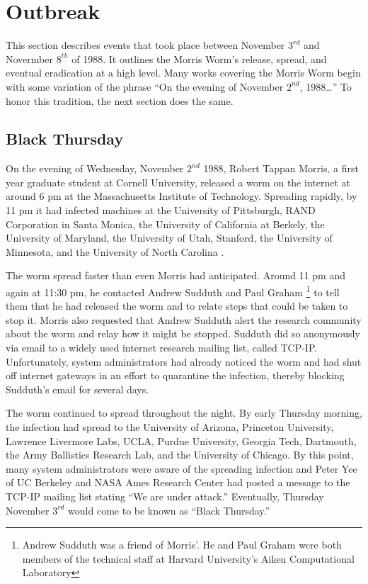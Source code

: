 \section*{Outbreak}
This section describes events that took place between November $3^{rd}$ and
Novermber $8^{th}$ of 1988. It outlines the Morris Worm's release, spread, and
eventual eradication at a high level.
Many works covering the Morris Worm begin with some variation of the phrase
``On the evening of November $2^{nd}$, 1988\ldots''
To honor this tradition, the next section does the same. 

\subsection*{Black Thursday}

On the evening of Wednesday, November $2^{nd}$ 1988, Robert Tappan Morris, a
first year graduate student at Cornell University, released a worm on the
internet at around 6 pm at the Massachusetts Institute of Technology.
Spreading rapidly, by 11 pm it had infected machines at
the University of Pittsburgh,
RAND Corporation in Santa Monica,
the University of California at Berkely,
the University of Maryland,
the University of Utah,
Stanford,
the University of Minnesota,
and the University of North Carolina
\cite{seeley_tour_1989}
\cite{spafford_internet_1989-1}.

The worm spread faster than even Morris had anticipated. Around
11 pm and again at 11:30 pm, he contacted Andrew Sudduth and Paul Graham
\footnote{
Andrew Sudduth was a friend of Morris'. He and Paul Graham were both
members of the technical staff at Harvard University's Aiken Computational
Laboratory\cite{lee_washpost_2013}
}
to tell them that he had released the worm and to relate steps that could be
taken to stop it. Morris also requested that Andrew Sudduth alert the research
community about the worm and relay how it might be stopped. 
Sudduth did so anonymously via email to a widely used internet research mailing
list, called TCP-IP.
Unfortunately, system administrators had already noticed the worm
and had shut off internet gateways in an effort to quarantine the infection, thereby blocking
Sudduth's email for several days\cite{lee_washpost_2013}\cite{eisenberg_cornell_1989}.

The worm continued to spread throughout the night. By early Thursday morning,
the infection had spread to the University of Arizona, Princeton University,
Lawrence Livermore Labs, UCLA, Purdue University, Georgia Tech, Dartmouth,
the Army Ballistics Research Lab, and the University of Chicago.
By this point, many system administrators were aware of the spreading
infection and Peter Yee of UC Berkeley and NASA Ames Research Center had
posted a message to the TCP-IP mailing list stating ``We are under
attack.''\cite{seeley_tour_1989}\cite{spafford_internet_1989-1} Eventually,
Thursday November $3^{rd}$ would come to be known as ``Black Thursday.'' 

